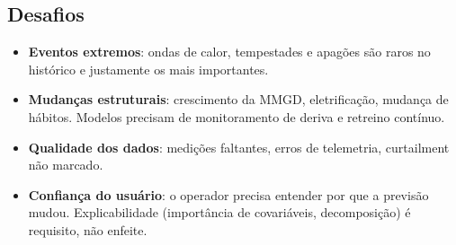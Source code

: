 \documentclass[11pt,a4paper]{article}
\begin{document}
\subsection{Desafios}
\begin{itemize}
  \item \textbf{Eventos extremos}: ondas de calor, tempestades e apagões são
    raros no histórico e justamente os mais importantes.
  \item \textbf{Mudanças estruturais}: crescimento da MMGD, eletrificação,
    mudança de hábitos. Modelos precisam de monitoramento de deriva e
    retreino contínuo.
  \item \textbf{Qualidade dos dados}: medições faltantes, erros de telemetria,
    curtailment não marcado.
  \item \textbf{Confiança do usuário}: o operador precisa entender por que a
    previsão mudou. Explicabilidade (importância de covariáveis, decomposição)
    é requisito, não enfeite.
\end{itemize}
\end{document}
